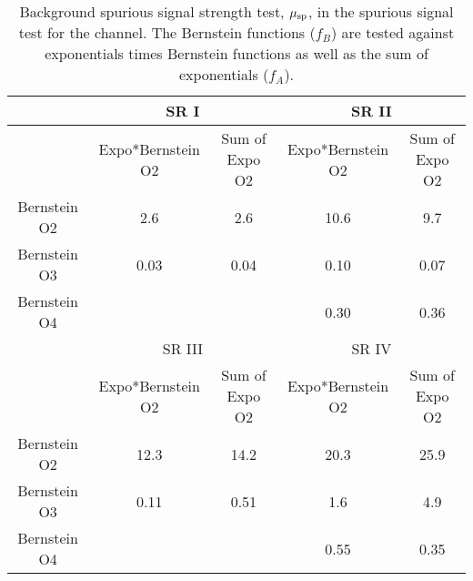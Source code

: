 \begin{table}[htpb]
\centering
\caption{Background spurious signal strength test, $\mu_{\rm sp}$, in the spurious signal test for the \fourcentral channel. The Bernstein functions ($f_B$) are tested against exponentials times Bernstein functions as well as the sum of exponentials ($f_A$).}
\label{tab:spurious-test-4cen_2Z}
\begin{tabular}{|c|c|c|c|c|}
\hline
             & \multicolumn{2}{c|}{SR I}          & \multicolumn{2}{c|}{SR II}         \\ \hline
             & Expo*Bernstein O2 & Sum of Expo O2 & Expo*Bernstein O2 & Sum of Expo O2 \\ \hline
Bernstein O2 & 2.6               & 2.6            & 10.6              & 9.7            \\ \hline
Bernstein O3 & 0.03              & 0.04           & 0.10              & 0.07           \\ \hline
Bernstein O4 &                   &                & 0.30              & 0.36           \\ \hline
             & \multicolumn{2}{c|}{SR III}        & \multicolumn{2}{c|}{SR IV}         \\ \hline
             & Expo*Bernstein O2 & Sum of Expo O2 & Expo*Bernstein O2 & Sum of Expo O2 \\ \hline
Bernstein O2 & 12.3              & 14.2           & 20.3              & 25.9           \\ \hline
Bernstein O3 & 0.11              & 0.51           & 1.6               & 4.9            \\ \hline
Bernstein O4 &                   &                & 0.55              & 0.35           \\ \hline
\end{tabular}
\end{table}
